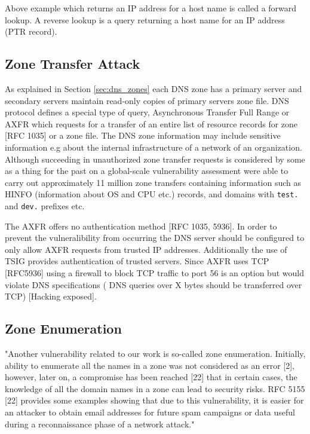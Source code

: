 Above example which returns an IP address for a host name is called a forward lookup. A reverse lookup is a query returning a host name for an IP address (PTR record).

\subsection{Zone Transfer Attack}

As explained in Section \ref{sec:dns_zones} each DNS zone has a primary server and secondary servers maintain read-only copies of primary servers zone file. DNS protocol defines a special type of query, Asynchronous Transfer Full Range or AXFR which requests for a transfer of an entire list of resource records for zone [RFC 1035] or a zone file. The DNS zone information may include sensitive information e.g about the internal infrastructure of a network of an organization. Although succeeding in unauthorized zone transfer requests is considered by some as a thing for the past \cite{network_sec_assessment} on a global-scale vulnerability assessment  \citet{global_zone_transfer} were able to carry out approximately 11 million zone transfers containing information such as HINFO (information about OS and CPU etc.) records, and domains with \texttt{test.} and \texttt{dev.} prefixes etc.

The AXFR offers no authentication method [RFC 1035, 5936]. In order to prevent the vulneralibility from occurring the DNS server should be configured to only allow AXFR requests from trusted IP addresses. Additionally the use of TSIG provides authentication of trusted servers. Since AXFR uses TCP [RFC5936] using a firewall to block TCP traffic to port 56 is an option but would violate DNS specifications ( DNS queries over X bytes should be transferred over TCP) [Hacking exposed].


\subsection{Zone Enumeration}

"Another vulnerability related to our work is so-called zone
enumeration. Initially, ability to enumerate all the names in
a zone was not considered as an error [2], however, later on,
a compromise has been reached [22] that in certain cases,
the knowledge of all the domain names in a zone can lead
to security risks. RFC 5155 [22] provides some examples
showing that due to this vulnerability, it is easier for an attacker
to obtain email addresses for future spam campaigns or data
useful during a reconnaissance phase of a network attack."  \citet{global_zone_transfer}

